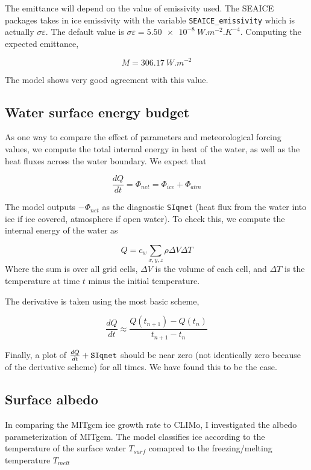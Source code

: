 \documentclass[11pt]{article}
\begin{document}
The emittance will depend on the value of emissivity used. The SEAICE packages takes in ice emissivity with the variable \verb|SEAICE_emissivity| which is actually $\sigma \varepsilon$. The default value is $\sigma \varepsilon = \SI{5.50e-8}{ W.m^{-2}.K^{-4}}$.  Computing the expected emittance, 

\begin{equation*}
M = \SI{306.17}{W.m^{-2}}
\end{equation*}

The model shows very good agreement with this value.	

\subsection{Water surface energy budget}
As one way to compare the effect of parameters and meteorological forcing values, we compute the total internal energy in heat of the water, as well as the heat fluxes across the water boundary. We expect that

\begin{equation}
\frac{d Q}{d t} = \Phi_{net} = \Phi_{ice} + \Phi_{atm}
\end{equation}

The model outputs $-\Phi_{net}$ as the diagnostic \verb|SIqnet| (heat flux from the water into ice if ice covered, atmosphere if open water). To check this, we compute the internal energy of the water as

\begin{equation}
Q = c_w \sum_{x, y, z} \rho \Delta V \Delta T
\end{equation}
Where the sum is over all grid cells, $\Delta V$ is the volume of each cell, and $\Delta T$ is the temperature at time $t$ minus the initial temperature.

The derivative is taken using the most basic scheme,

\begin{equation*}
\frac{d Q}{d t} \approx \frac{Q(t_{n+1}) - Q(t_n)}{t_{n+1} - t_n}
\end{equation*}

Finally, a plot of $\frac{d Q}{d t} + \verb|SIqnet|$ should be near zero (not identically zero because of the derivative scheme) for all times. We have found this to be the case.

\subsection{Surface albedo}
\label{sec:MITgcmAlbedo}
In comparing the MITgcm ice growth rate to CLIMo, I investigated the albedo parameterization of MITgcm. The model classifies ice according to the temperature of the surface water $T_{surf}$ comapred to the freezing/melting temperature $T_{melt}$
\end{document}
